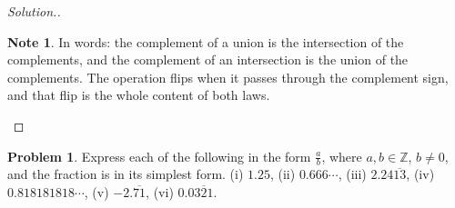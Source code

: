 \documentclass[11pt,a4paper]{article}
\theoremstyle{definition}
\newtheorem{note}[thm]{Note}
\newtheorem{problemx}{Problem}[section]
\newenvironment{problem}{\begin{problemx}}{\end{problemx}}
\newenvironment{solution}
  {\renewcommand{\qedsymbol}{}\begin{proof}[\textit{Solution}.]}
  {\end{proof}}
\begin{document}
\begin{solution}
\begin{note}
In words: the complement of a union is the intersection of the complements, and the
complement of an intersection is the union of the complements. The operation flips when
it passes through the complement sign, and that flip is the whole content of both laws.
\end{note}
\end{solution}

\begin{problem}
Express each of the following in the form $\frac{a}{b}$, where $a,b\in\mathbb{Z}$,
$b\neq 0$, and the fraction is in its simplest form.
\quad (i) $1.25$, \quad (ii) $0.666\cdots$, \quad (iii) $2.24\overline{13}$, \quad
(iv) $0.818181818\cdots$, \quad (v) $-2.\overline{71}$, \quad (vi) $0.0\overline{321}$.
\end{problem}
\end{document}
